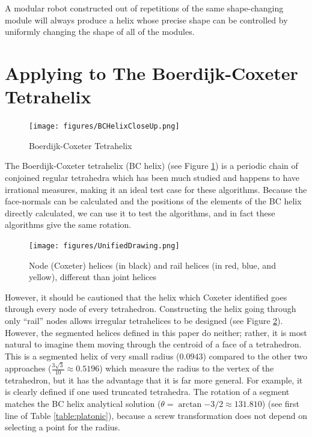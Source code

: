 \documentclass[11pt]{article}
\begin{document}
{A modular robot constructed out of repetitions of the same shape-changing module will always
produce a helix
whose precise shape can be controlled by uniformly changing the shape of all of the modules.


\section{Applying to The Boerdijk-Coxeter Tetrahelix}

\begin{figure}
     \centering
     \texttt{[image: figures/BCHelixCloseUp.png]}
     \caption{Boerdijk-Coxeter Tetrahelix}
  \label{fig:bchelix}
\end{figure}

The Boerdijk-Coxeter tetrahelix (BC helix) (see Figure \ref{fig:bchelix}) is a periodic chain of conjoined regular tetrahedra
which has been much studied\cite{coxeter1985simplicial,sadler2013periodic,fuller1982synergetics,read2018transforming}
and happens to have irrational measures, making it an ideal
test case for these algorithms. Because the face-normals can be calculated and the
positions of the elements of the BC helix directly calculated, we can use
it to test the algorithms, and in fact these algorithms give the same rotation.


\begin{figure}
     \centering
     \texttt{[image: figures/UnifiedDrawing.png]}
     \caption{Node (Coxeter) helices (in black) and rail helices (in red, blue, and yellow),
       different than joint helices}
  \label{fig:helixnodes}
\end{figure}

However, it should be cautioned that the helix which Coxeter identified\cite{coxeter1985simplicial}
goes through every node of every tetrahedron. Constructing the helix going
through only ``rail'' nodes allows irregular tetrahelices to be designed\cite{read2018transforming}
(see Figure \ref{fig:helixnodes}).
However, the segmented helices defined in this paper do neither; rather, it is most natural to
imagine them moving through the centroid of a face of a tetrahedron.
This is a segmented helix of
very small radius ($0.0943$) compared to the other two approaches
($\frac{3\sqrt{3}}{10} \approx 0.5196$) which measure the radius to the
vertex of the tetrahedron, but it has
the advantage that it is far more general. For example, it is
clearly defined if one used truncated tetrahedra.
The rotation of a
segment matches the BC helix analytical solution
($\theta = \arctan{-3/2} \approx 131.810$) (see first line of Table \ref{table:platonic}),
because a screw transformation does not depend on selecting a point for the radius.

}
\end{document}
